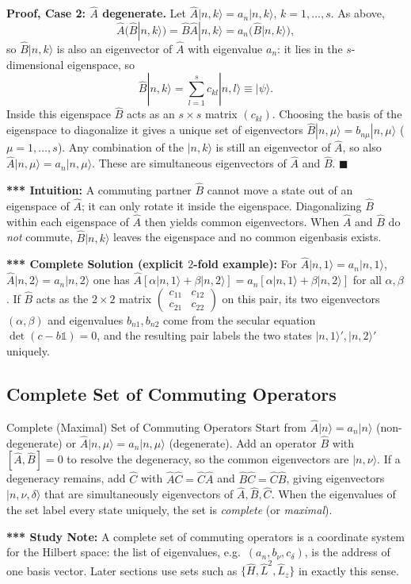 \documentclass[11pt,a4paper]{article}
\begin{document}
\textbf{Proof, Case 2: $\hat A$ degenerate.} Let $\hat A|n,k\rangle=a_n|n,k\rangle$, $k=1,\dots,s$. As above,
\[
\hat A\big(\hat B|n,k\rangle\big)=\hat B\hat A|n,k\rangle=a_n\big(\hat B|n,k\rangle\big),
\]
so $\hat B|n,k\rangle$ is also an eigenvector of $\hat A$ with eigenvalue $a_n$: it lies in the $s$-dimensional eigenspace, so
\[
\hat B|n,k\rangle=\sum_{l=1}^sc_{kl}|n,l\rangle\equiv|\psi\rangle .
\]
Inside this eigenspace $\hat B$ acts as an $s\times s$ matrix $(c_{kl})$. Choosing the basis of the eigenspace to diagonalize it gives a unique set of eigenvectors $\hat B|n,\mu\rangle=b_{n\mu}|n,\mu\rangle$ ($\mu=1,\dots,s$). Any combination of the $|n,k\rangle$ is still an eigenvector of $\hat A$, so also $\hat A|n,\mu\rangle=a_n|n,\mu\rangle$. These are simultaneous eigenvectors of $\hat A$ and $\hat B$. $\blacksquare$

\textbf{*** Intuition:} A commuting partner $\hat B$ cannot move a state out of an eigenspace of $\hat A$; it can only rotate it inside the eigenspace. Diagonalizing $\hat B$ within each eigenspace of $\hat A$ then yields common eigenvectors. When $\hat A$ and $\hat B$ do \emph{not} commute, $\hat B|n,k\rangle$ leaves the eigenspace and no common eigenbasis exists.

\textbf{*** Complete Solution (explicit $2$-fold example):} For $\hat A|n,1\rangle=a_n|n,1\rangle$, $\hat A|n,2\rangle=a_n|n,2\rangle$ one has $\hat A[\alpha|n,1\rangle+\beta|n,2\rangle]=a_n[\alpha|n,1\rangle+\beta|n,2\rangle]$ for all $\alpha,\beta$. If $\hat B$ acts as the $2\times2$ matrix $\begin{pmatrix}c_{11}&c_{12}\\c_{21}&c_{22}\end{pmatrix}$ on this pair, its two eigenvectors $(\alpha,\beta)$ and eigenvalues $b_{n1},b_{n2}$ come from the secular equation $\det(c-b\mathbb 1)=0$, and the resulting pair labels the two states $|n,1\rangle',|n,2\rangle'$ uniquely.

\subsection{Complete Set of Commuting Operators}
\begin{thm}{Complete (Maximal) Set of Commuting Operators}
Start from $\hat A|n\rangle=a_n|n\rangle$ (non-degenerate) or $\hat A|n,\mu\rangle=a_n|n,\mu\rangle$ (degenerate). Add an operator $\hat B$ with $[\hat A,\hat B]=0$ to resolve the degeneracy, so the common eigenvectors are $|n,\nu\rangle$. If a degeneracy remains, add $\hat C$ with $\hat A\hat C=\hat C\hat A$ and $\hat B\hat C=\hat C\hat B$, giving eigenvectors $|n,\nu,\delta\rangle$ that are simultaneously eigenvectors of $\hat A,\hat B,\hat C$. When the eigenvalues of the set label every state uniquely, the set is \emph{complete} (or \emph{maximal}).
\end{thm}
\textbf{*** Study Note:} A complete set of commuting operators is a coordinate system for the Hilbert space: the list of eigenvalues, e.g.\ $(a_n,b_\nu,c_\delta)$, is the address of one basis vector. Later sections use sets such as $\{\hat H,\hat L^2,\hat L_z\}$ in exactly this sense.
\end{document}

